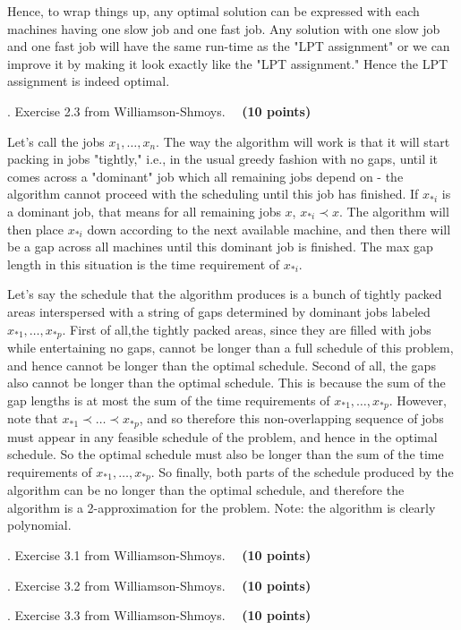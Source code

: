 \documentclass{article}[11pt]
\begin{document}
Hence, to wrap things up, any optimal solution can be expressed with each machines having one slow job and one fast job. Any solution with one slow job and one fast job will have the same run-time as the "LPT assignment" or we can improve it by making it look exactly like the "LPT assignment." Hence the LPT assignment is indeed optimal.


\medskip {}. 
Exercise 2.3 from Williamson-Shmoys. ~~\textbf{(10 points)}

Let's call the jobs $x_1, \ldots, x_n$. The way the algorithm will work is that it will start packing in jobs "tightly," i.e., in the usual greedy fashion with no gaps, until it comes across a "dominant" job which all remaining jobs depend on - the algorithm cannot proceed with the scheduling until this job has finished. If $x_{*i}$ is a dominant job, that means for all remaining jobs $x$, $x_{*i} \prec x$. The algorithm will then place $x_{*i}$ down according to the next available machine, and then there will be a gap across all machines until this dominant job is finished. The max gap length in this situation is the time requirement of $x_{*i}$. 

Let's say the schedule that the algorithm produces is a bunch of tightly packed areas interspersed with a string of gaps determined by dominant jobs labeled $x_{*1}, \ldots,x_{*p}$. First of all,the tightly packed areas, since they are filled with jobs while entertaining no gaps, cannot be longer than a full schedule of this problem, and hence cannot be longer than the optimal schedule. Second of all, the gaps also cannot be longer than the optimal schedule. This is because the sum of the gap lengths is at most the sum of the time requirements of $x_{*1}, \ldots,x_{*p} $. However, note that $x_{*1} \prec \ldots \prec x_{*p}$, and so therefore this non-overlapping sequence of jobs must appear in any feasible schedule of the problem, and hence in the optimal schedule. So the optimal schedule must also be longer than the sum of the time requirements of $x_{*1}, \ldots,x_{*p} $. So finally, both parts of the schedule produced by the algorithm can be no longer than the optimal schedule, and therefore the algorithm is a 2-approximation for the problem. Note: the algorithm is clearly polynomial.

\medskip {}. 
Exercise 3.1 from Williamson-Shmoys. ~~\textbf{(10 points)}

\medskip {}. 
Exercise 3.2 from Williamson-Shmoys. ~~\textbf{(10 points)}

\medskip {}. 
Exercise 3.3 from Williamson-Shmoys. ~~\textbf{(10 points)}
\end{document}
